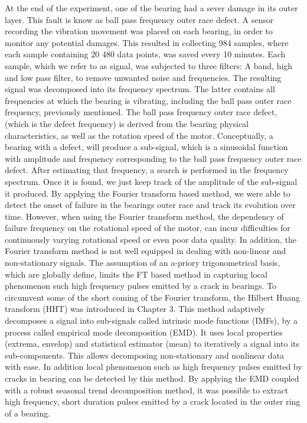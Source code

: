 \documentclass[thesis.tex]{subfiles}
\begin{document}
	At the end of the experiment, one of the bearing had a sever damage in its outer layer. This fault is know as ball pass frequency outer race defect. A sensor recording the vibration movement was placed on each bearing, in order to monitor any potential damages. This resulted in collecting 984 samples, where each sample containing 20 480 data points, was saved every 10 minutes.
	\justify
	Each sample, which we refer to as signal, was subjected to three filters: A band, high and low pass filter, to remove unwanted noise and frequencies. The resulting signal was decomposed into its frequency spectrum. The latter contains all frequencies at which the bearing is vibrating, including the ball pass outer race frequency, previously mentioned.
	The ball pass frequency outer race defect, (which is the defect frequency) is derived from the bearing physical characteristics, as well as the rotation speed of the motor. Conceptually, a bearing with a defect, will produce a sub-signal, which is a sinusoidal function with amplitude and frequency corresponding to the ball pass frequency outer race defect. After estimating that frequency, a search is performed in the frequency spectrum. Once it is found, we just keep track of the amplitude of the sub-signal it produced.
	\justify
	By applying the Fourier transform based method, we were able to detect the onset of failure in the bearings outer race and track its evolution over time. However, when using the Fourier transform method, the dependency of failure frequency on the rotational speed of the motor, can incur difficulties for continuously varying rotational speed or even poor data quality. In addition, the Fourier transform method is not well equipped in dealing with non-linear and non-stationary signals. The assumption of an a-priory trigonometrical basis, which are globally define, limits the FT based method in capturing local phenomenon such high frequency pulses emitted by a crack in bearings.
	\justify
	To circumvent some of the short coming of the Fourier transform, the Hilbert Huang transform (HHT) was introduced in Chapter 3.
	This method adaptively decomposes a signal into sub-signals called intrinsic mode functions (IMFs), by a process called empirical mode decomposition (EMD). It uses local properties (extrema, envelop) and statistical estimator (mean) to iteratively	 a signal into its sub-components. This allows decomposing non-stationary and nonlinear data with ease. In addition local phenomenon such as high frequency pulses emitted by cracks in bearing can be detected by this method. By applying the EMD coupled with a robust seasonal trend decomposition method, it was possible to extract high frequency, short duration pulses emitted by a crack located in the outer ring of a bearing.
\end{document}
